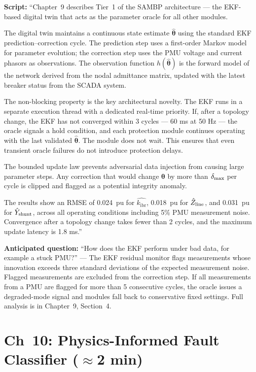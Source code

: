 \documentclass[11pt,a4paper]{article}
\newcommand{\script}[1]{\begin{scriptbox}\textbf{Script:} #1\end{scriptbox}}
\newcommand{\anticipate}[1]{\begin{warnbox}\textbf{Anticipated question:} #1\end{warnbox}}
\newcommand{\kibr}{k_{\mathrm{ibr}}}
\begin{document}
\script{%
``Chapter~9 describes Tier~1 of the SAMBP architecture --- the EKF-based digital twin
that acts as the parameter oracle for all other modules.

The digital twin maintains a continuous state estimate $\hat{\boldsymbol{\theta}}$ using
the standard EKF prediction--correction cycle. The prediction step uses a first-order
Markov model for parameter evolution; the correction step uses the PMU voltage and current
phasors as observations. The observation function $h(\hat{\boldsymbol{\theta}})$ is the
forward model of the network derived from the nodal admittance matrix, updated with the
latest breaker status from the SCADA system.

The non-blocking property is the key architectural novelty. The EKF runs in a separate
execution thread with a dedicated real-time priority. If, after a topology change, the
EKF has not converged within 3 cycles --- 60 ms at 50 Hz --- the oracle signals a hold
condition, and each protection module continues operating with the last validated
$\hat{\boldsymbol{\theta}}$. The module does not wait. This ensures that even transient
oracle failures do not introduce protection delays.

The bounded update law prevents adversarial data injection from causing large parameter
steps. Any correction that would change $\boldsymbol{\theta}$ by more than $\delta_{\rm max}$
per cycle is clipped and flagged as a potential integrity anomaly.

The results show an RMSE of 0.024~pu for $\hat{\kibr}$, 0.018~pu for
$\hat{Z}_{\rm line}$, and 0.031~pu for $\hat{Y}_{\rm shunt}$, across all operating
conditions including 5\% PMU measurement noise. Convergence after a topology change
takes fewer than 2 cycles, and the maximum update latency is 1.8 ms.''%
}

\anticipate{``How does the EKF perform under bad data, for example a stuck PMU?'' ---
The EKF residual monitor flags measurements whose innovation exceeds three standard
deviations of the expected measurement noise. Flagged measurements are excluded from
the correction step. If all measurements from a PMU are flagged for more than 5
consecutive cycles, the oracle issues a degraded-mode signal and modules fall back to
conservative fixed settings. Full analysis is in Chapter~9, Section~4.}

\section{Ch~10: Physics-Informed Fault Classifier \hfill\normalfont\small($\approx$2 min)}
\label{slide:pinn}
\end{document}
